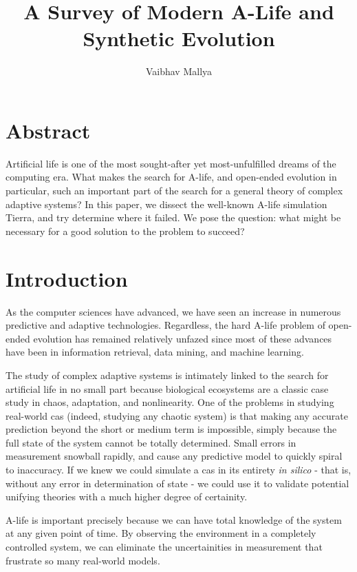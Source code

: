 \documentclass{article}
\begin{document}
\title{A Survey of Modern A-Life and Synthetic Evolution}
\author{Vaibhav Mallya}
\maketitle
\section{Abstract}

Artificial life is one of the most sought-after yet most-unfulfilled dreams of the computing era.
What makes the search for A-life, and open-ended evolution in particular, such an important part of the search for a general theory of complex adaptive systems?
In this paper, we dissect the well-known A-life simulation Tierra, and try determine where it failed. We pose the question: what might be necessary for a good solution to the problem to succeed?

\section{Introduction}
As the computer sciences have advanced, we have seen an increase in numerous predictive and adaptive technologies. Regardless, the hard A-life problem of open-ended evolution has remained relatively unfazed since most of these advances have been in information retrieval, data mining, and machine learning.

The study of complex adaptive systems is intimately linked to the search for artificial life in no small part because biological ecosystems are a classic case study in chaos, adaptation, and nonlinearity. One of the problems in studying real-world cas (indeed, studying any chaotic system) is that making any accurate prediction beyond the short or medium term is impossible, simply because the full state of the system cannot be totally determined. 
Small errors in measurement snowball rapidly, and cause any predictive model to quickly spiral to inaccuracy. If we knew we could simulate a cas in its entirety \emph{in silico} - that is, without any error in determination of state - we could use it to validate potential unifying theories with a much higher degree of certainity.

A-life is important precisely because we can have total knowledge of the system at any given point of time. By observing the environment in a completely controlled system, we can eliminate the uncertainities in measurement that frustrate so many real-world models. 
\end{document}
